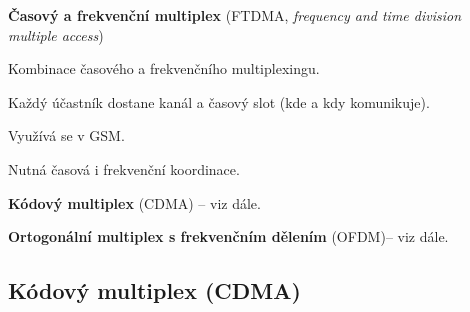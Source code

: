 \begin{compactitem}
\begin{compactenum}
        \item \textbf{Časový a frekvenční multiplex} (FTDMA, \textit{frequency and time division multiple access}) \begin{compactitem}
            \item Kombinace časového a frekvenčního multiplexingu.
            \item Každý účastník dostane kanál a časový slot (kde a kdy komunikuje).
            \item Využívá se v GSM.
            \item Nutná časová i frekvenční koordinace.
        \end{compactitem}

        \item \textbf{Kódový multiplex} (CDMA) -- viz dále.

        \item \textbf{Ortogonální multiplex s frekvenčním dělením} (OFDM)-- viz dále.
    \end{compactenum}
\end{compactitem}

\subsection{Kódový multiplex (CDMA)}

